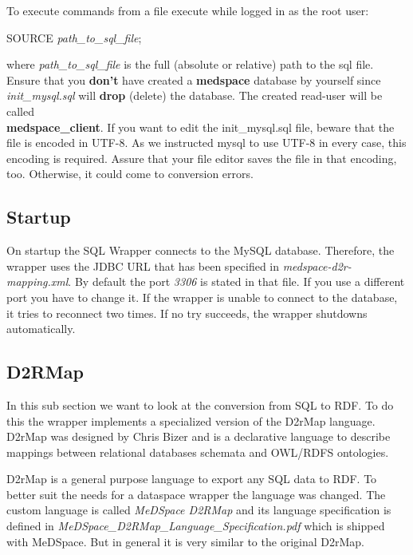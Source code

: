 To execute commands from a file execute while logged in as the root user:

\begin{codebox}
	SOURCE \emph{path\_to\_sql\_file};
\end{codebox}

where \emph{path\_to\_sql\_file} is the full (absolute or relative) path to the sql file.
Ensure that you \textbf{don't} have created a \textbf{medspace} database by yourself since \emph{init\_mysql.sql} will \textbf{drop} (delete) the database. The created read-user will be called\\ 
\textbf{medspace\_client}. If you want to edit the init\_mysql.sql file, beware that the file is encoded in UTF-8. As we instructed mysql to use UTF-8 in every case, this encoding is required. Assure that your file editor saves the file in that encoding, too. Otherwise, it could come to conversion errors.

\subsection{Startup}

On startup the SQL Wrapper connects to the MySQL database. Therefore, the wrapper uses the JDBC URL that has been specified in \emph{medspace-d2r-mapping.xml}. By default the port \emph{3306} is stated in that file. If you use a different port you have to change it. If the wrapper is unable to connect to the database, it tries to reconnect two times. If no try succeeds, the wrapper shutdowns automatically.  


\subsection{D2RMap}

In this sub section we want to look at the conversion from SQL to RDF. To do this the wrapper implements a specialized version of the D2rMap language. D2rMap was designed by Chris Bizer and is  a declarative language to describe mappings between relational databases schemata and OWL/RDFS ontologies\cite{D2rMap_aDatabaseToRdfMappingLanguage}.

D2rMap is a general purpose language to export any SQL data to RDF. To better suit the needs for a dataspace wrapper the language was changed. The custom language is called \emph{MeDSpace D2RMap} and its language specification is defined in \emph{MeDSpace\_D2RMap\_Language\_Specification.pdf} which is shipped with MeDSpace. But in general it is very similar to the original D2rMap.\\


